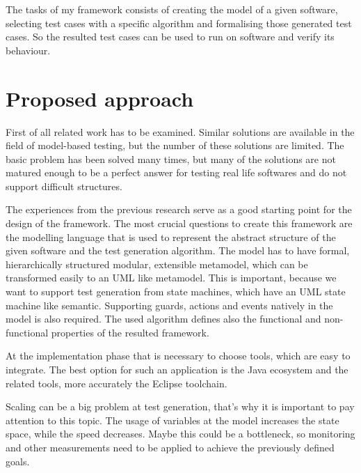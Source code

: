 The tasks of my framework consists of creating the model of a given software, selecting test cases with a specific algorithm and formalising those generated test cases. So the resulted test cases can be used to run on software and verify its behaviour.


\section*{Proposed approach}
\label{sec:proposedapproach}

First of all related work has to be examined. Similar solutions are available in the field of model-based testing, but the number of these solutions are limited. The basic problem has been solved many times, but many of the solutions are not matured enough to be a perfect answer for testing real life softwares and do not support difficult structures.

The experiences from the previous research serve as a good starting point for the design of the framework. The most crucial questions to create this framework are the modelling language that is used to represent the abstract structure of the given software and the test generation algorithm. The model has to have formal, hierarchically structured modular, extensible metamodel, which can be transformed easily to an UML like metamodel. This is important, because we want to support test generation from state machines, which have an UML state machine like semantic. Supporting guards, actions and events natively in the model is also required. The used algorithm defines also the functional and non-functional properties of the resulted framework. 

At the implementation phase that is necessary to choose tools, which are easy to integrate. The best option for such an application is the Java ecosystem and the related tools, more accurately the Eclipse toolchain.

Scaling can be a big problem at test generation, that's why it is important to pay attention to this topic. The usage of variables at the model increases the state space, while the speed decreases. Maybe this could be a bottleneck, so monitoring and other measurements need to be applied to achieve the previously defined goals.


